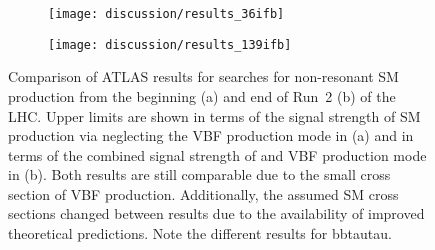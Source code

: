 \begin{figure}[tbp]
  \centering

  \begin{subfigure}[b]{0.53\textwidth}
    \texttt{[image: discussion/results\_36ifb]}

    \label{fig:atlas_run2_36ifb}
  \end{subfigure}\hfill%
  \begin{subfigure}[b]{0.46\textwidth}
    \texttt{[image: discussion/results\_139ifb]}

    \label{fig:atlas_run2_139ifb}
  \end{subfigure}

  \caption{Comparison of ATLAS results for searches for non-resonant
    SM \HH production from the beginning (a) and end of Run~2 (b) of
    the LHC. Upper limits are shown in terms of the signal strength of
    SM \HH production via \ggF neglecting the VBF production mode in
    (a) and in terms of the combined signal strength of \ggF and VBF
    production mode in (b). Both results are still comparable due to
    the small cross section of VBF \HH production. Additionally, the
    assumed SM \HH cross sections changed between results due to the
    availability of improved theoretical predictions.  Note the
    different results for bbtautau. }
  \label{fig:atlas_run2_hh_results}
\end{figure}

\begin{table}[tbp]
  \centering


  \caption{Table of CMS results of searches for non-resonant
    production of Higgs boson pairs with an integrated luminosity of
    \SI{138}{\per\femto\barn}. Upper limits are shown at
    \SI{95}{\percent} CL on the signal strength of the combination of
    the \ggF and VBF production modes.}%
  \label{tab:cms_nonresonant}

  
\end{table}

